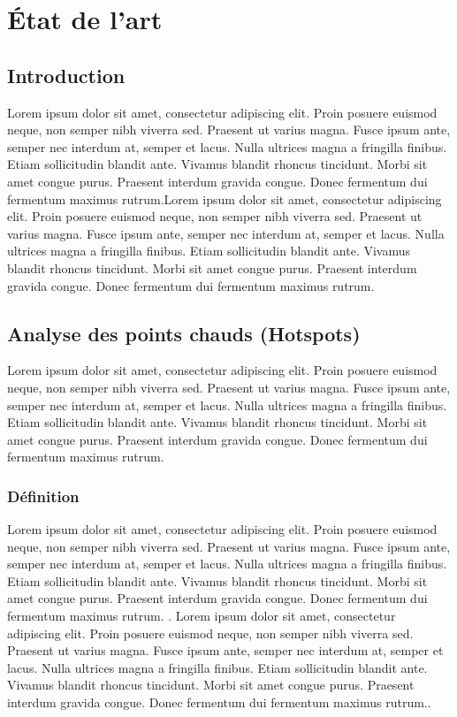 \chapter{État de l'art}

\clearpage

\section{Introduction}
Lorem ipsum dolor sit amet, consectetur adipiscing elit. Proin posuere euismod neque, non semper nibh viverra sed. Praesent ut varius magna. Fusce ipsum ante, semper nec interdum at, semper et lacus. Nulla ultrices magna a fringilla finibus. Etiam sollicitudin blandit ante. Vivamus blandit rhoncus tincidunt. Morbi sit amet congue purus. Praesent interdum gravida congue. Donec fermentum dui fermentum maximus rutrum.Lorem ipsum dolor sit amet, consectetur adipiscing elit. Proin posuere euismod neque, non semper nibh viverra sed. Praesent ut varius magna. Fusce ipsum ante, semper nec interdum at, semper et lacus. Nulla ultrices magna a fringilla finibus. Etiam sollicitudin blandit ante. Vivamus blandit rhoncus tincidunt. Morbi sit amet congue purus. Praesent interdum gravida congue. Donec fermentum dui fermentum maximus rutrum.

\section{Analyse des points chauds (Hotspots)}
\label{sec:hotspot}
Lorem ipsum dolor sit amet, consectetur adipiscing elit. Proin posuere euismod neque, non semper nibh viverra sed. Praesent ut varius magna. Fusce ipsum ante, semper nec interdum at, semper et lacus. Nulla ultrices magna a fringilla finibus. Etiam sollicitudin blandit ante. Vivamus blandit rhoncus tincidunt. Morbi sit amet congue purus. Praesent interdum gravida congue. Donec fermentum dui fermentum maximus rutrum.

\medskip

\subsection{Définition}
Lorem ipsum dolor sit amet, consectetur adipiscing elit. Proin posuere euismod neque, non semper nibh viverra sed. Praesent ut varius magna. Fusce ipsum ante, semper nec interdum at, semper et lacus. Nulla ultrices magna a fringilla finibus. Etiam sollicitudin blandit ante. Vivamus blandit rhoncus tincidunt. Morbi sit amet congue purus. Praesent interdum gravida congue. Donec fermentum dui fermentum maximus rutrum. \parencite{mennis_spatial_2009}. Lorem ipsum dolor sit amet, consectetur adipiscing elit. Proin posuere euismod neque, non semper nibh viverra sed. Praesent ut varius magna. Fusce ipsum ante, semper nec interdum at, semper et lacus. Nulla ultrices magna a fringilla finibus. Etiam sollicitudin blandit ante. Vivamus blandit rhoncus tincidunt. Morbi sit amet congue purus. Praesent interdum gravida congue. Donec fermentum dui fermentum maximus rutrum.\parencite{shekhar_identifying_2011}.

